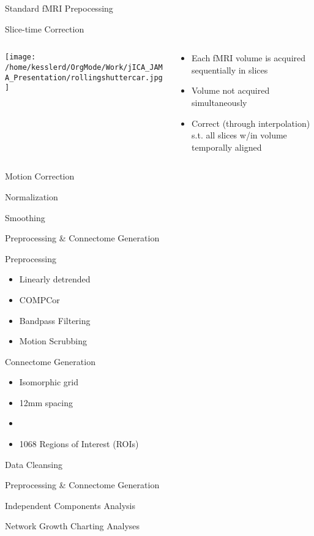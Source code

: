 \documentclass[presentation]{beamer}
\begin{document}
\begin{frame}[label={sec:orgheadline8}]{Standard fMRI Prepocessing}
\begin{block}{Slice-time Correction}
\begin{columns}
\begin{column}{.2\columnwidth}
\texttt{[image: /home/kesslerd/OrgMode/Work/jICA\_JAMA\_Presentation/rollingshuttercar.jpg]}
\end{column}
\begin{column}{.5\columnwidth}
\begin{itemize}
\item Each fMRI volume is acquired sequentially in slices
\item Volume not acquired simultaneously
\item Correct (through interpolation) s.t. all slices w/in volume temporally aligned
\end{itemize}
\end{column}
\end{columns}
\end{block}
\begin{block}{Motion Correction}
\end{block}
\begin{block}{Normalization}
\end{block}
\begin{block}{Smoothing}
\end{block}
\end{frame}

\begin{frame}[label={sec:orgheadline9}]{Preprocessing \& Connectome Generation}
\begin{block}{Preprocessing}
\begin{itemize}
\item Linearly detrended
\item COMPCor
\item Bandpass Filtering
\item Motion Scrubbing
\end{itemize}
\end{block}
\begin{block}{Connectome Generation}
\begin{itemize}
\item Isomorphic grid
\item 12mm spacing
\item 

\item 1068 Regions of Interest (ROIs)
\end{itemize}
\end{block}
\end{frame}
\begin{frame}[label={sec:orgheadline10}]{Data Cleansing}
\end{frame}
\begin{frame}[label={sec:orgheadline11}]{Preprocessing \& Connectome Generation}
\end{frame}
\begin{frame}[label={sec:orgheadline12}]{Independent Components Analysis}
\end{frame}
\begin{frame}[label={sec:orgheadline13}]{Network Growth Charting Analyses}
\end{frame}
\end{document}
